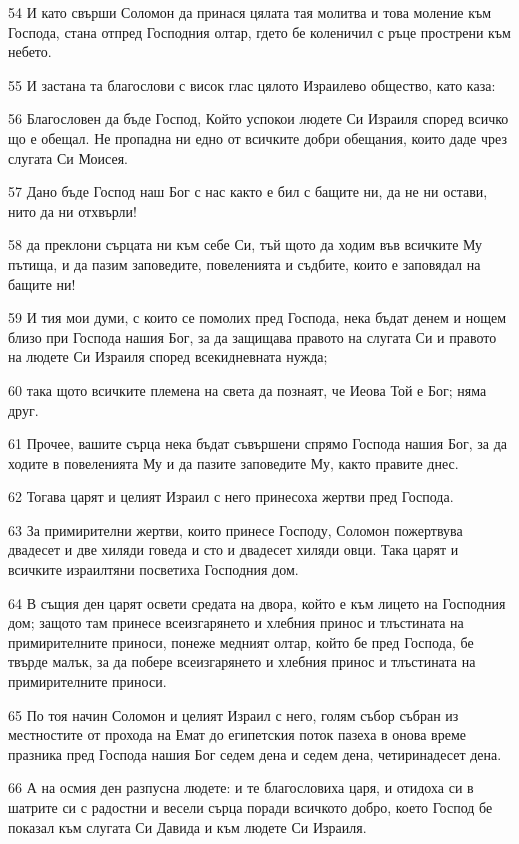 \par 54 И като свърши Соломон да принася цялата тая молитва и това моление към Господа, стана отпред Господния олтар, гдето бе коленичил с ръце прострени към небето.
\par 55 И застана та благослови с висок глас цялото Израилево общество, като каза:
\par 56 Благословен да бъде Господ, Който успокои людете Си Израиля според всичко що е обещал. Не пропадна ни едно от всичките добри обещания, които даде чрез слугата Си Моисея.
\par 57 Дано бъде Господ наш Бог с нас както е бил с бащите ни, да не ни остави, нито да ни отхвърли!
\par 58 да преклони сърцата ни към себе Си, тъй щото да ходим във всичките Му пътища, и да пазим заповедите, повеленията и съдбите, които е заповядал на бащите ни!
\par 59 И тия мои думи, с които се помолих пред Господа, нека бъдат денем и нощем близо при Господа нашия Бог, за да защищава правото на слугата Си и правото на людете Си Израиля според всекидневната нужда;
\par 60 така щото всичките племена на света да познаят, че Иеова Той е Бог; няма друг.
\par 61 Прочее, вашите сърца нека бъдат съвършени спрямо Господа нашия Бог, за да ходите в повеленията Му и да пазите заповедите Му, както правите днес.
\par 62 Тогава царят и целият Израил с него принесоха жертви пред Господа.
\par 63 За примирителни жертви, които принесе Господу, Соломон пожертвува двадесет и две хиляди говеда и сто и двадесет хиляди овци. Така царят и всичките израилтяни посветиха Господния дом.
\par 64 В същия ден царят освети средата на двора, който е към лицето на Господния дом; защото там принесе всеизгарянето и хлебния принос и тлъстината на примирителните приноси, понеже медният олтар, който бе пред Господа, бе твърде малък, за да побере всеизгарянето и хлебния принос и тлъстината на примирителните приноси.
\par 65 По тоя начин Соломон и целият Израил с него, голям събор събран из местностите от прохода на Емат до египетския поток пазеха в онова време празника пред Господа нашия Бог седем дена и седем дена, четиринадесет дена.
\par 66 А на осмия ден разпусна людете: и те благословиха царя, и отидоха си в шатрите си с радостни и весели сърца поради всичкото добро, което Господ бе показал към слугата Си Давида и към людете Си Израиля.


